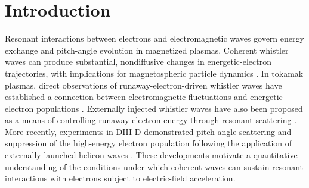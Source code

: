 \documentclass{jpp}
\begin{document}
%

\section{Introduction}

Resonant interactions between electrons and electromagnetic waves govern energy exchange and pitch-angle evolution in magnetized plasmas. Coherent whistler waves can produce substantial, nondiffusive changes in energetic-electron trajectories, with implications for magnetospheric particle dynamics \citep{YoonBellan2020}. In tokamak plasmas, direct observations of runaway-electron-driven whistler waves have established a connection between electromagnetic fluctuations and energetic-electron populations \citep{Spong2018}. Externally injected whistler waves have also been proposed as a means of controlling runaway-electron energy through resonant scattering \citep{Guo2018}. More recently, experiments in DIII-D demonstrated pitch-angle scattering and suppression of the high-energy electron population following the application of externally launched helicon waves \citep{Choudhury2026}. These developments motivate a quantitative understanding of the conditions under which coherent waves can sustain resonant interactions with electrons subject to electric-field acceleration.
\end{document}
